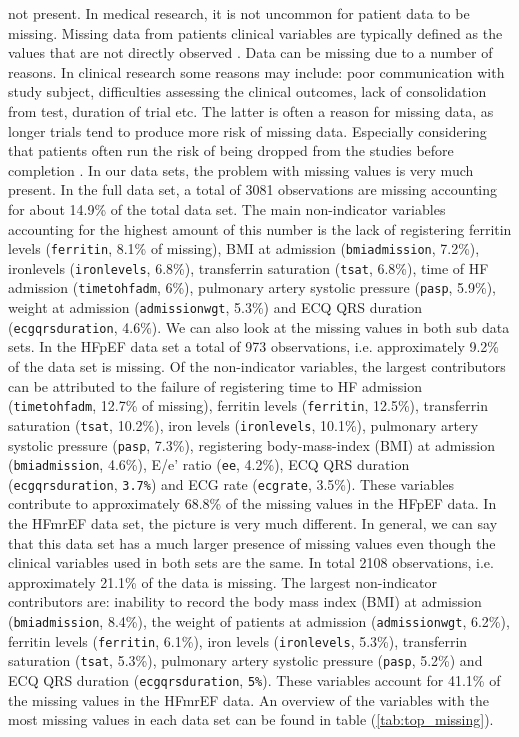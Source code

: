 \documentclass[../thesis.tex]{subfiles}
\begin{document}
\noindent not present. In medical research, it is not uncommon for patient data to be missing. Missing data from patients clinical variables are typically defined as the values that are not directly observed \citep{ibrahim2012missing}. Data can be missing due to a number of reasons. In clinical research some reasons may include: poor communication with study subject, difficulties assessing the clinical outcomes, lack of consolidation from test, duration of trial etc. The latter is often a reason for missing data, as longer trials tend to produce more risk of missing data. Especially considering that patients often run the risk of being dropped from the studies before completion \citep{myers2000handling}. In our data sets, the problem with missing values is very much present. In the full data set, a total of 3081 observations are missing accounting for about 14.9\% of the total data set. The main non-indicator variables accounting for the highest amount of this number is the lack of registering ferritin levels (\texttt{ferritin}, 8.1\% of missing), BMI at admission (\texttt{bmiadmission}, 7.2\%), ironlevels (\texttt{ironlevels}, 6.8\%), transferrin saturation (\texttt{tsat}, 6.8\%), time of HF admission (\texttt{timetohfadm}, 6\%), pulmonary artery systolic pressure (\texttt{pasp}, 5.9\%), weight at admission (\texttt{admissionwgt}, 5.3\%) and ECQ QRS duration (\texttt{ecgqrsduration}, 4.6\%). We can also look at the missing values in both sub data sets. In the HFpEF data set a total of 973 observations, i.e. approximately 9.2\% of the data set is missing. Of the non-indicator variables, the largest contributors can be attributed to the failure of registering time to HF admission (\texttt{timetohfadm}, 12.7\% of missing), ferritin levels (\texttt{ferritin}, 12.5\%), transferrin saturation (\texttt{tsat}, 10.2\%), iron levels (\texttt{ironlevels}, 10.1\%), pulmonary artery systolic pressure (\texttt{pasp}, 7.3\%), registering body-mass-index (BMI) at admission (\texttt{bmiadmission}, 4.6\%), E/e' ratio (\texttt{ee}, 4.2\%), ECQ QRS duration (\texttt{ecgqrsduration}, \texttt{3.7\%}) and ECG rate (\texttt{ecgrate}, 3.5\%). These variables contribute to approximately 68.8\% of the missing values in the HFpEF data. In the HFmrEF data set, the picture is very much different. In general, we can say that this data set has a much larger presence of missing values even though the clinical variables used in both sets are the same. In total 2108 observations, i.e. approximately 21.1\% of the data is missing. The largest non-indicator contributors are: inability to record the body mass index (BMI) at admission (\texttt{bmiadmission}, 8.4\%), the weight of patients at admission (\texttt{admissionwgt}, 6.2\%), ferritin levels (\texttt{ferritin}, 6.1\%), iron levels (\texttt{ironlevels}, 5.3\%), transferrin saturation (\texttt{tsat}, 5.3\%), pulmonary artery systolic pressure (\texttt{pasp}, 5.2\%) and ECQ QRS duration (\texttt{ecgqrsduration}, \texttt{5\%}). These variables account for 41.1\% of the missing values in the HFmrEF data. An overview of the variables with the most missing values in each data set can be found in table (\ref{tab:top_missing}).
\end{document}
